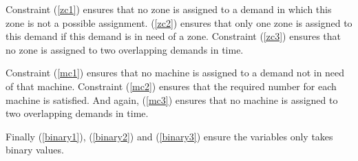 \documentclass[../../thesis.tex]{subfiles}
\begin{document}
Constraint (\ref{zc1}) ensures that no zone is assigned to a demand in which this zone is not a possible assignment. (\ref{zc2}) ensures that only one zone is assigned to this demand if this demand is in need of a zone. Constraint (\ref{zc3}) ensures that no zone is assigned to two overlapping demands in time.

Constraint (\ref{mc1}) ensures that no machine is assigned to a demand not in need of that machine. Constraint (\ref{mc2}) ensures that the required number for each machine is satisfied. And again, (\ref{mc3}) ensures that no machine is assigned to two overlapping demands in time.


Finally (\ref{binary1}), (\ref{binary2}) and (\ref{binary3}) ensure the variables only takes binary values.
\end{document}
